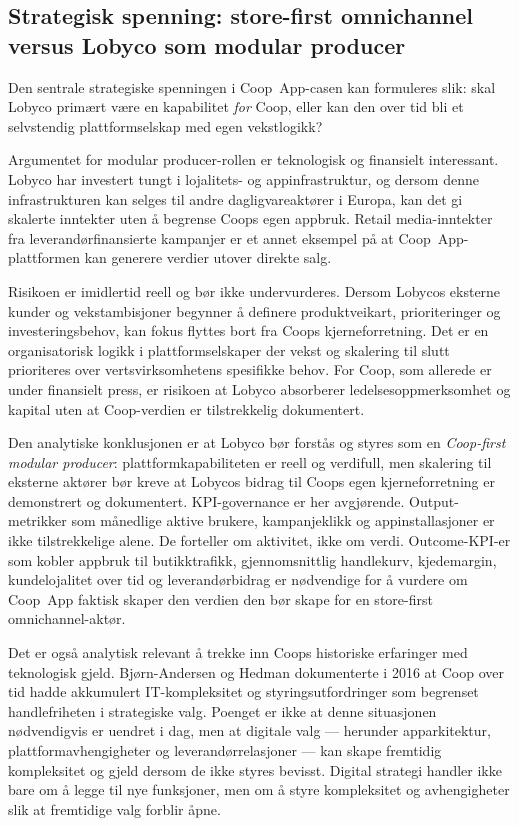 \documentclass[12pt,a4paper]{article}
\begin{document}
\subsection{Strategisk spenning: store-first omnichannel versus Lobyco som modular producer}

Den sentrale strategiske spenningen i Coop~App-casen kan formuleres slik: skal Lobyco primært være en kapabilitet \textit{for} Coop, eller kan den over tid bli et selvstendig plattformselskap med egen vekstlogikk?

Argumentet for modular producer-rollen er teknologisk og finansielt interessant. Lobyco har investert tungt i lojalitets- og appinfrastruktur, og dersom denne infrastrukturen kan selges til andre dagligvareaktører i Europa, kan det gi skalerte inntekter uten å begrense Coops egen appbruk. Retail media-inntekter fra leverandørfinansierte kampanjer er et annet eksempel på at Coop~App-plattformen kan generere verdier utover direkte salg.

Risikoen er imidlertid reell og bør ikke undervurderes. Dersom Lobycos eksterne kunder og vekstambisjoner begynner å definere produktveikart, prioriteringer og investeringsbehov, kan fokus flyttes bort fra Coops kjerneforretning. Det er en organisatorisk logikk i plattformselskaper der vekst og skalering til slutt prioriteres over vertsvirksomhetens spesifikke behov. For Coop, som allerede er under finansielt press, er risikoen at Lobyco absorberer ledelsesoppmerksomhet og kapital uten at Coop-verdien er tilstrekkelig dokumentert.

Den analytiske konklusjonen er at Lobyco bør forstås og styres som en \textit{Coop-first modular producer}: plattformkapabiliteten er reell og verdifull, men skalering til eksterne aktører bør kreve at Lobycos bidrag til Coops egen kjerneforretning er demonstrert og dokumentert. KPI-governance er her avgjørende. Output-metrikker som månedlige aktive brukere, kampanjeklikk og appinstallasjoner er ikke tilstrekkelige alene. De forteller om aktivitet, ikke om verdi. Outcome-KPI-er som kobler appbruk til butikktrafikk, gjennomsnittlig handlekurv, kjedemargin, kundelojalitet over tid og leverandørbidrag er nødvendige for å vurdere om Coop~App faktisk skaper den verdien den bør skape for en store-first omnichannel-aktør.

Det er også analytisk relevant å trekke inn Coops historiske erfaringer med teknologisk gjeld. Bjørn-Andersen og Hedman dokumenterte i 2016 at Coop over tid hadde akkumulert IT-kompleksitet og styringsutfordringer som begrenset handlefriheten i strategiske valg. Poenget er ikke at denne situasjonen nødvendigvis er uendret i dag, men at digitale valg --- herunder apparkitektur, plattformavhengigheter og leverandørrelasjoner --- kan skape fremtidig kompleksitet og gjeld dersom de ikke styres bevisst. Digital strategi handler ikke bare om å legge til nye funksjoner, men om å styre kompleksitet og avhengigheter slik at fremtidige valg forblir åpne.
\end{document}
